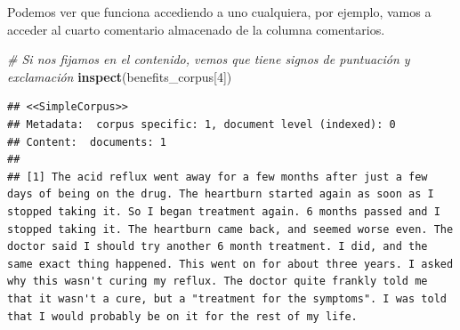 \documentclass[spanish,]{article}
\newenvironment{Shaded}{\begin{snugshade}}{\end{snugshade}}
\newcommand{\KeywordTok}[1]{\textcolor[rgb]{0.13,0.29,0.53}{\textbf{#1}}}
\newcommand{\DecValTok}[1]{\textcolor[rgb]{0.00,0.00,0.81}{#1}}
\newcommand{\StringTok}[1]{\textcolor[rgb]{0.31,0.60,0.02}{#1}}
\newcommand{\CommentTok}[1]{\textcolor[rgb]{0.56,0.35,0.01}{\textit{#1}}}
\newcommand{\OperatorTok}[1]{\textcolor[rgb]{0.81,0.36,0.00}{\textbf{#1}}}
\newcommand{\NormalTok}[1]{#1}
\begin{document}
\begin{Shaded}
\end{Shaded}

Podemos ver que funciona accediendo a uno cualquiera, por ejemplo, vamos
a acceder al cuarto comentario almacenado de la columna comentarios.

\begin{Shaded}
\begin{Highlighting}[]
\CommentTok{# Si nos fijamos en el contenido, vemos que tiene signos de puntuación y exclamación}
\KeywordTok{inspect}\NormalTok{(benefits_corpus[}\DecValTok{4}\NormalTok{])}
\end{Highlighting}
\end{Shaded}

\begin{verbatim}
## <<SimpleCorpus>>
## Metadata:  corpus specific: 1, document level (indexed): 0
## Content:  documents: 1
## 
## [1] The acid reflux went away for a few months after just a few days of being on the drug. The heartburn started again as soon as I stopped taking it. So I began treatment again. 6 months passed and I stopped taking it. The heartburn came back, and seemed worse even. The doctor said I should try another 6 month treatment. I did, and the same exact thing happened. This went on for about three years. I asked why this wasn't curing my reflux. The doctor quite frankly told me that it wasn't a cure, but a "treatment for the symptoms". I was told that I would probably be on it for the rest of my life.
\end{verbatim}
\end{document}
